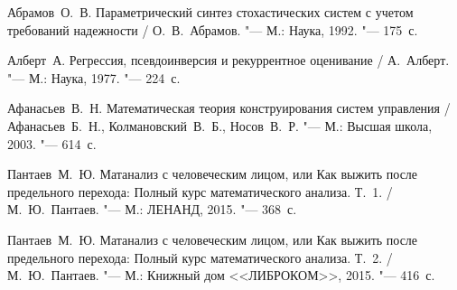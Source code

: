 \begin{thebibliography}{99}

Абрамов~О.~В. Параметрический синтез стохастических систем с учетом
требований надежности / О.~В.~Абрамов. "--- М.: Наука, 1992. "--- 175~с.

Алберт~А. Регрессия, псевдоинверсия и рекуррентное оценивание /
А.~Алберт. "--- М.: Наука, 1977. "--- 224~с.

Афанасьев~В.~Н. Математическая теория конструирования систем
управления / Афанасьев~Б.~Н., Колмановский~В.~Б., Носов~В.~Р. "--- М.: Высшая школа, 2003. "--- 614~с.

Пантаев~М.~Ю. Матанализ с человеческим лицом, или Как выжить после предельного перехода: Полный курс математического анализа. Т.~1. / М.~Ю.~Пантаев. "--- М.: ЛЕНАНД, 2015. "--- 368~с.

Пантаев~М.~Ю. Матанализ с человеческим лицом, или Как выжить после предельного перехода: Полный курс математического анализа. Т.~2. / М.~Ю.~Пантаев. "--- М.: Книжный дом <<ЛИБРОКОМ>>, 2015. "--- 416~с.

\end{thebibliography}